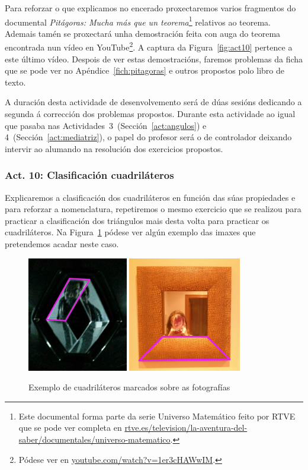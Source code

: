 Para reforzar o que explicamos no encerado proxectaremos varios fragmentos do documental \emph{Pitágoras: Mucha más que un teorema}\footnote{Este documental forma parte da serie Universo Matemático feito por RTVE que se pode ver completa en \href{http://www.rtve.es/television/la-aventura-del-saber/documentales/universo-matematico/}{rtve.es/television/la-aventura-del-saber/documentales/universo-matematico}.} relativos ao teorema. Ademais tamén se proxectará unha demostración feita con auga do teorema encontrada nun vídeo en YouTube\footnote{Pódese ver en \href{https://www.youtube.com/watch?v=1er3cHAWwIM}{youtube.com/watch?v=1er3cHAWwIM}.}. A captura da Figura~\ref{fig:act10} pertence a este último vídeo. Despois de ver estas demostracións, faremos problemas da ficha que se pode ver no Apéndice~\ref{fich:pitagoras} e outros propostos polo libro de texto.


A duración desta actividade de desenvolvemento será de dúas sesións dedicando a segunda á corrección dos problemas propostos. Durante esta actividade ao igual que pasaba nas Actividades~3~(Sección~\ref{act:angulos}) e 4~(Sección~\ref{act:mediatriz}), o papel do profesor será o de controlador deixando intervir ao alumando na resolución dos exercicios propostos.

\subsubsection{Act. 10: Clasificación cuadriláteros}\label{act:cuadrilateros}
Explicaremos a clasificación dos cuadriláteros en función das súas propiedades e para reforzar a nomenclatura, repetiremos o mesmo exercicio que se realizou para practicar a clasificación dos triángulos mais desta volta para practicar os cuadriláteros. Na Figura~\ref{fig:act11} pódese ver algún exemplo das imaxes que pretendemos acadar neste caso.

\begin{figure}[h!]
  \centering
  \includegraphics[height=5cm]{img/cuad1.jpg}
  \includegraphics[height=5cm]{img/cuad2.jpg}
  \caption{Exemplo de cuadriláteros marcados sobre as fotografías}\label{fig:act11}
\end{figure}

